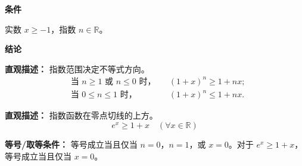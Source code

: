 \begin{statementbox}

\textbf{\textcolor{CStatement}{条件}}
\begin{description}[style=nextline, leftmargin=2.8em, labelsep=0.5em, itemsep=0.35em]
    \item[\textbf{\textcolor{CStatement}{条件 1（实数范围）：}}] 实数 $x \geq -1$，指数 $n \in \mathbb{R}$。
\end{description}

\textbf{\textcolor{CStatement}{结论}}
\begin{description}[style=nextline, leftmargin=2.8em, labelsep=0.5em, itemsep=0.45em]
    \item[\textbf{\textcolor{CStatement}{结论一（指数分界）：}}]
    \textbf{\textcolor{CStatement}{直观描述：}} 指数范围决定不等式方向。
    \[
    \begin{aligned}
        &\text{当 } n \geq 1 \text{ 或 } n \leq 0 \text{ 时，} && (1+x)^{n} \geq 1+nx; \\
        &\text{当 } 0 \leq n \leq 1 \text{ 时，} && (1+x)^{n} \leq 1+nx.
    \end{aligned}
    \]

    \item[\textbf{\textcolor{CStatement}{推广结论（指数形式）：}}]
    \textbf{\textcolor{CStatement}{直观描述：}} 指数函数在零点切线的上方。
    \[
    e^{x} \geq 1+x \quad (\forall x \in \mathbb{R})
    \]
\end{description}

\textbf{\textcolor{CStatement}{等号/取等条件：}} 等号成立当且仅当 $n=0$，$n=1$，或 $x=0$。对于 $e^{x} \geq 1+x$，等号成立当且仅当 $x=0$。

\end{statementbox}
